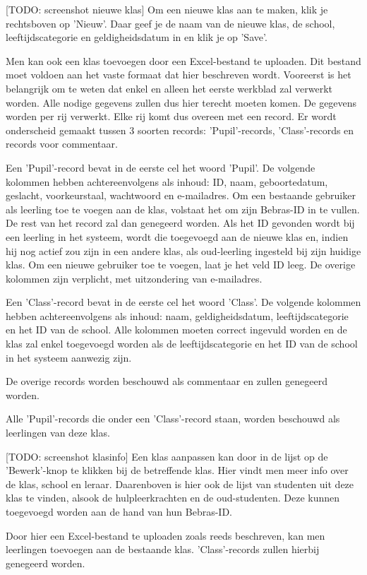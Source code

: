 \documentclass[]{article}
\begin{document}
[TODO: screenshot nieuwe klas]
Om een nieuwe klas aan te maken, klik je rechtsboven op 'Nieuw'. Daar geef je de naam van de nieuwe klas, de school, leeftijdscategorie en geldigheidsdatum in en klik je op 'Save'.

Men kan ook een klas toevoegen door een Excel-bestand te uploaden. Dit bestand moet voldoen aan het vaste formaat dat hier beschreven wordt. 
Vooreerst is het belangrijk om te weten dat enkel en alleen het eerste werkblad zal verwerkt worden. Alle nodige gegevens zullen dus hier terecht moeten komen. De gegevens worden per rij verwerkt. Elke rij komt dus overeen met een record. Er wordt onderscheid gemaakt tussen 3 soorten records: 'Pupil'-records, 'Class'-records en records voor commentaar.

Een 'Pupil'-record bevat in de eerste cel het woord 'Pupil'. De volgende kolommen hebben achtereenvolgens als inhoud: ID, naam, geboortedatum, geslacht, voorkeurstaal, wachtwoord en e-mailadres. Om een bestaande gebruiker als leerling toe te voegen aan de klas, volstaat het om zijn Bebras-ID in te vullen. De rest van het record zal dan genegeerd worden. Als het ID gevonden wordt bij een leerling in het systeem, wordt die toegevoegd aan de nieuwe klas en, indien hij nog actief zou zijn in een andere klas, als oud-leerling ingesteld bij zijn huidige klas.  
Om een nieuwe gebruiker toe te voegen, laat je het veld ID leeg. De overige kolommen zijn verplicht, met uitzondering van e-mailadres.

Een 'Class'-record bevat in de eerste cel het woord 'Class'. De volgende kolommen hebben achtereenvolgens als inhoud: naam, geldigheidsdatum, leeftijdscategorie en het ID van de school. Alle kolommen moeten correct ingevuld worden en de klas zal enkel toegevoegd worden als de leeftijdscategorie en het ID van de school in het systeem aanwezig zijn. 

De overige records worden beschouwd als commentaar en zullen genegeerd worden.

Alle 'Pupil'-records die onder een 'Class'-record staan, worden beschouwd als leerlingen van deze klas. 

[TODO: screenshot klasinfo]
Een klas aanpassen kan door in de lijst op de 'Bewerk'-knop te klikken bij de betreffende klas. Hier vindt men meer info over de klas, school en leraar. Daarenboven is hier ook de lijst van studenten uit deze klas te vinden, alsook de hulpleerkrachten en de oud-studenten. Deze kunnen toegevoegd worden aan de hand van hun Bebras-ID.

Door hier een Excel-bestand te uploaden zoals reeds beschreven, kan men leerlingen toevoegen aan de bestaande klas. 'Class'-records zullen hierbij genegeerd worden.
\end{document}
